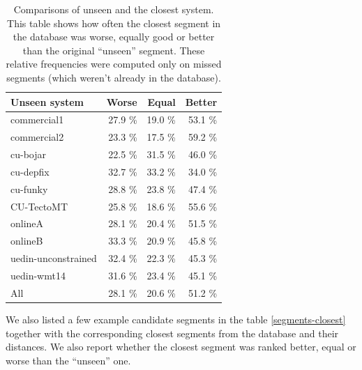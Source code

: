 \begin{table}
  \centering
\begin{tabular}{|lrrr|}
  \hline
  \textbf{Unseen system}            &   \textbf{Worse} &   \textbf{Equal} &   \textbf{Better} \\
  \hline
   commercial1         &   27.9 \% &   19.0 \% &    53.1 \% \\
   commercial2         &   23.3 \% &   17.5 \% &    59.2 \% \\
   cu-bojar            &   22.5 \% &   31.5 \% &    46.0 \% \\
   cu-depfix           &   32.7 \% &   33.2 \% &    34.0 \% \\
   cu-funky            &   28.8 \% &   23.8 \% &    47.4 \% \\
   CU-TectoMT          &   25.8 \% &   18.6 \% &    55.6 \% \\
   onlineA             &   28.1 \% &   20.4 \% &    51.5 \% \\
   onlineB             &   33.3 \% &   20.9 \% &    45.8 \% \\
   uedin-unconstrained &   32.4 \% &   22.3 \% &    45.3 \% \\
   uedin-wmt14         &   31.6 \% &   23.4 \% &    45.1 \% \\
  \hline
   All               &   28.1 \% &   20.6 \% &    51.2 \% \\
  \hline
\end{tabular}

\caption[Comparisons of unseen and the closest systems]{Comparisons of unseen
and the closest system. This table shows how often the closest segment in the
database was worse, equally good or better than the original ``unseen''
segment. These relative frequencies were computed only on missed segments
(which weren't already in the database).}

  \label{edit-distance-matching-analysis}
\end{table}


We also listed a few example candidate segments in the table
\ref{segments-closest} together with the corresponding closest segments from
the database and their distances. We also report whether the closest segment
was ranked better, equal or worse than the ``unseen'' one.

